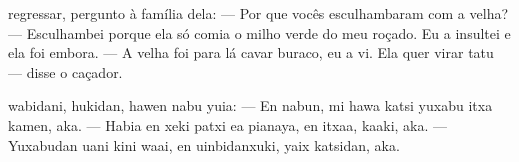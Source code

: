 

 regressar, pergunto
à família dela:\break
--- Por que vocês
esculhambaram com a velha?\break
--- Esculhambei porque ela só
comia o milho verde do meu
roçado. Eu a insultei e
ela foi embora.\break
--- A velha foi para lá cavar
buraco, eu a vi. Ela quer virar
tatu — disse o caçador.

\vspace{2em}

 wabidani, hukidan,
hawen nabu yuia:\break
--- En nabun, mi hawa
katsi yuxabu
itxa kamen, aka.\break
--- Habia en xeki patxi
ea pianaya,
en itxaa, kaaki, aka.\break
--- Yuxabudan uani kini
waai, en uinbidanxuki,
yaix katsidan, aka.

\vspace*{\fill}

